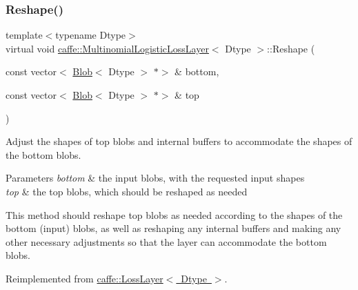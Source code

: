 \mbox{\label{classcaffe_1_1_multinomial_logistic_loss_layer_afd5162d1fc8be1a4abdf1afaa96519f8}} 
\subsubsection{\texorpdfstring{Reshape()}{Reshape()}\hspace{0.1cm}{\footnotesize\ttfamily [1/2]}}
{\footnotesize\ttfamily template$<$typename Dtype$>$ \\
virtual void \mbox{\hyperlink{classcaffe_1_1_multinomial_logistic_loss_layer}{caffe\+::\+Multinomial\+Logistic\+Loss\+Layer}}$<$ Dtype $>$\+::Reshape (\begin{DoxyParamCaption}\item[{const vector$<$ \mbox{\hyperlink{classcaffe_1_1_blob}{Blob}}$<$ Dtype $>$ $\ast$$>$ \&}]{bottom,  }\item[{const vector$<$ \mbox{\hyperlink{classcaffe_1_1_blob}{Blob}}$<$ Dtype $>$ $\ast$$>$ \&}]{top }\end{DoxyParamCaption})\hspace{0.3cm}{\ttfamily [virtual]}}



Adjust the shapes of top blobs and internal buffers to accommodate the shapes of the bottom blobs. 


\begin{DoxyParams}{Parameters}
{\em bottom} & the input blobs, with the requested input shapes \\
\hline
{\em top} & the top blobs, which should be reshaped as needed\\
\hline
\end{DoxyParams}
This method should reshape top blobs as needed according to the shapes of the bottom (input) blobs, as well as reshaping any internal buffers and making any other necessary adjustments so that the layer can accommodate the bottom blobs. 

Reimplemented from \mbox{\hyperlink{classcaffe_1_1_loss_layer_abf00412194f5413ea9468ee44b0d986f}{caffe\+::\+Loss\+Layer$<$ Dtype $>$}}.

\mbox{\label{classcaffe_1_1_multinomial_logistic_loss_layer_a979be47987712c02dfb57a88b2a69f11}} 
